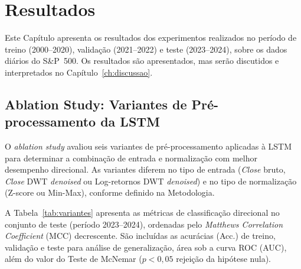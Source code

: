 \chapter[Resultados]{Resultados}
\label{ch:resultados}

Este Capítulo apresenta os resultados dos experimentos realizados no período de treino (2000--2020), validação (2021--2022) e teste (2023--2024), sobre os dados diários do S\&P~500. Os resultados são apresentados, mas serão discutidos e interpretados no Capítulo~\ref{ch:discussao}.

\section{Ablation Study: Variantes de Pré-processamento da LSTM}
\label{sec:res_ablation}

O \textit{ablation study} avaliou seis variantes de pré-processamento aplicadas à LSTM para determinar a combinação de entrada e normalização com melhor desempenho direcional. As variantes diferem no tipo de entrada (\textit{Close} bruto, \textit{Close} DWT \textit{denoised} ou Log-retornos DWT \textit{denoised}) e no tipo de normalização (Z-score ou Min-Max), conforme definido na Metodologia.

A Tabela~\ref{tab:variantes} apresenta as métricas de classificação direcional no conjunto de teste (período 2023--2024), ordenadas pelo \textit{Matthews Correlation Coefficient} (MCC) decrescente. São incluídas as acurácias (Acc.) de treino, validação e teste para análise de generalização, área sob a curva ROC (AUC), além do valor do Teste de McNemar ($p < 0{,}05$ rejeição da hipótese nula).

